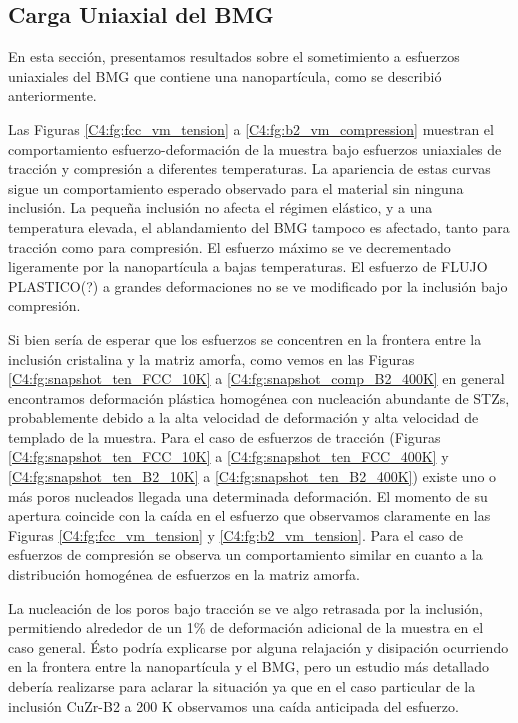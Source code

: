 \subsection{Carga Uniaxial del BMG}
\label{S4_3_2}

En esta sección, presentamos resultados sobre el sometimiento a esfuerzos uniaxiales del BMG que contiene una nanopartícula, como se describió anteriormente.

Las Figuras \ref{C4:fg:fcc_vm_tension} a \ref{C4:fg:b2_vm_compression} muestran el comportamiento esfuerzo-deformación de la muestra bajo esfuerzos uniaxiales de tracción y compresión a diferentes temperaturas. La apariencia de estas curvas sigue un comportamiento esperado observado para el material sin ninguna inclusión. La pequeña inclusión no afecta el régimen elástico, y a una temperatura elevada, el ablandamiento del BMG tampoco es afectado, tanto para tracción como para compresión. El esfuerzo máximo se ve decrementado ligeramente por la nanopartícula a bajas temperaturas. El esfuerzo de FLUJO PLASTICO(?) a grandes deformaciones no se ve modificado por la inclusión bajo compresión.

Si bien sería de esperar que los esfuerzos se concentren en la frontera entre la inclusión cristalina y la matriz amorfa, como vemos en las Figuras \ref{C4:fg:snapshot_ten_FCC_10K} a \ref{C4:fg:snapshot_comp_B2_400K} en general encontramos deformación plástica homogénea con nucleación abundante de STZs, probablemente debido a la alta velocidad de deformación y alta velocidad de templado de la muestra. Para el caso de esfuerzos de tracción (Figuras \ref{C4:fg:snapshot_ten_FCC_10K} a \ref{C4:fg:snapshot_ten_FCC_400K} y \ref{C4:fg:snapshot_ten_B2_10K} a \ref{C4:fg:snapshot_ten_B2_400K}) existe uno o más poros nucleados llegada una determinada deformación. El momento de su apertura coincide con la caída en el esfuerzo que observamos claramente en las Figuras \ref{C4:fg:fcc_vm_tension} y \ref{C4:fg:b2_vm_tension}. Para el caso de esfuerzos de compresión se observa un comportamiento similar en cuanto a la distribución homogénea de esfuerzos en la matriz amorfa.

La nucleación de los poros bajo tracción se ve algo retrasada por la inclusión, permitiendo alrededor de un 1\% de deformación adicional de la muestra en el caso general. Ésto podría explicarse por alguna relajación y disipación ocurriendo en la frontera entre la nanopartícula y el BMG, pero un estudio más detallado debería realizarse para aclarar la situación ya que en el caso particular de la inclusión CuZr-B2 a 200 K observamos una caída anticipada del esfuerzo.

